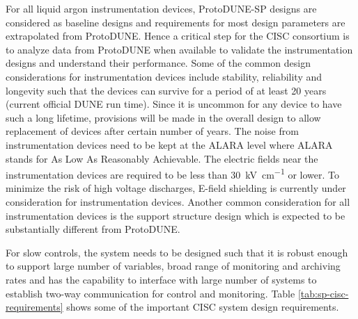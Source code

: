 
For all liquid argon instrumentation devices, ProtoDUNE-SP designs are
considered as baseline designs and requirements for most design
parameters are extrapolated from ProtoDUNE. Hence a critical step for
the CISC consortium is to analyze data from ProtoDUNE when available
to validate the instrumentation designs and understand their
performance. Some of the common design considerations for
instrumentation devices include stability, reliability and longevity
such that the devices can survive for a period of at least 20 years
(current official DUNE run time).  Since it is uncommon for any device
to have such a long lifetime, provisions will be made in the overall
design to allow replacement of devices after certain number of
years. The noise from instrumentation devices need to be kept at the
ALARA level where ALARA stands for As Low As Reasonably
Achievable. The electric fields near the instrumentation devices are
required to be less than \SI{30}{kV\per\cm} or lower. To minimize the
risk of high voltage discharges, E-field shielding is currently under
consideration for instrumentation devices. Another common
consideration for all instrumentation devices is the support structure
design which is expected to be substantially different from ProtoDUNE.

For slow controls, the system needs to be designed such that it is
robust enough to support large number of variables, broad range of
monitoring and archiving rates and has the capability to interface
with large number of systems to establish two-way communication for
control and monitoring. Table \ref{tab:sp-cisc-requirements} shows
some of the important CISC system design requirements.


